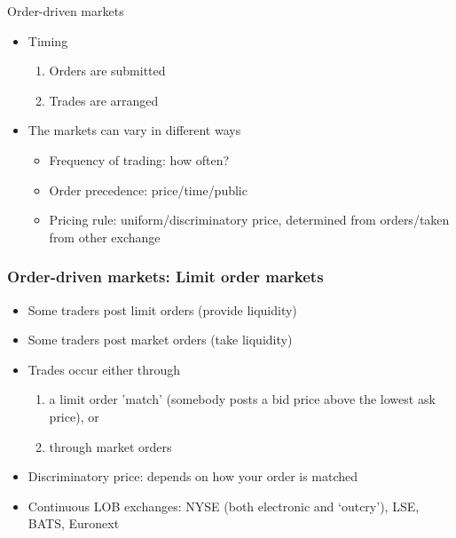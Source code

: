 \documentclass[english,10pt]{beamer}
\theoremstyle{definition}
\begin{document}
\begin{frame}{Order-driven markets}
\begin{itemize}
	\item Timing
	\begin{enumerate}
		\item Orders are submitted
		\item Trades are arranged
	\end{enumerate}
	\item The markets can vary in different ways
	\begin{itemize}
		\item Frequency of trading: how often?
		\item Order precedence: price/time/public
		\item Pricing rule: uniform/discriminatory price, determined from orders/taken from other exchange
	\end{itemize}
\end{itemize}
\end{frame}


\begin{frame}
\frametitle{Order-driven markets: Limit order markets}
\begin{itemize}
	\item Some traders post limit orders (provide liquidity)
	\item Some traders post market orders (take liquidity)
	\item Trades occur either through 
	\begin{enumerate}
		\item a limit order 'match' (somebody posts a bid price above the lowest ask price), or
		\item through market orders
	\end{enumerate}
	\item \alert{Discriminatory price}: depends on how your order is matched
	\item Continuous LOB exchanges: NYSE (both electronic and `outcry'), LSE, BATS, Euronext
\end{itemize}
\end{frame}
\end{document}
